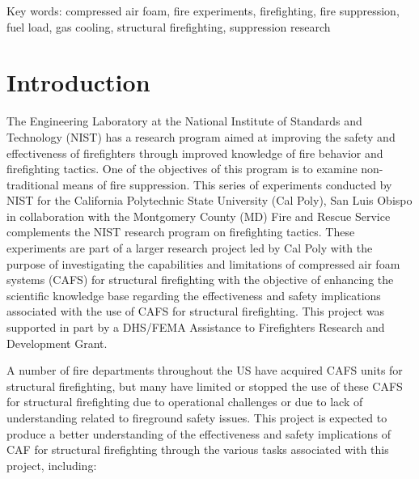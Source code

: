 \documentclass[12pt,oneside]{book}
\begin{document}
\vspace{0.5in}
Key words: compressed air foam, fire experiments, firefighting, fire suppression, fuel load, gas cooling, structural firefighting, suppression research  


\chapter{Introduction}
\label{chap:Introduction}
\setcounter{page}{1}

The Engineering Laboratory at the National Institute of Standards and Technology (NIST) has a research program aimed at improving the safety and effectiveness of firefighters through improved knowledge of fire behavior and firefighting tactics. One of the objectives of this program is to examine non-traditional means of fire suppression. This series of experiments conducted by NIST for the California Polytechnic State University (Cal Poly), San Luis Obispo in collaboration with the Montgomery County (MD) Fire and Rescue Service complements the NIST research program on firefighting tactics. These experiments are part of a larger research project led by Cal Poly with the purpose of investigating the capabilities and limitations of compressed air foam systems (CAFS) for structural firefighting with the objective of enhancing the scientific knowledge base regarding the effectiveness and safety implications associated with the use of CAFS for structural firefighting.  This project was supported in part by a DHS/FEMA Assistance to Firefighters Research and Development Grant.

A number of fire departments throughout the US have acquired CAFS units for structural firefighting, but many have limited or stopped the use of these CAFS for structural firefighting due to operational challenges or due to lack of understanding related to fireground safety issues. This project is expected to produce a better understanding of the effectiveness and safety implications of CAF for structural firefighting through the various tasks associated with this project, including: 
\end{document}
